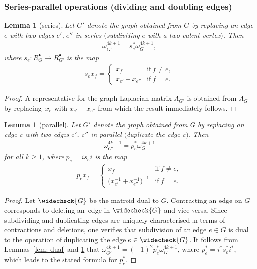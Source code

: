 \documentclass[pdftex]{sigma}%
\newtheorem{lem}[thm]{Lemma}
\numberwithin{equation}{section}
\newcommand{\0}{\color{blue}{\mathsf{0}}}
\begin{document}
 \subsubsection{Series-parallel operations (dividing and doubling edges)}

\begin{lem}[series] \label{lem: series}
 Let $G'$ denote the graph obtained from $G$ by replacing an edge $e$ with two edges $e'$, $e''$ in series $($subdividing $e$ with a two-valent vertex$)$. Then
\begin{gather*}
 \omega^{4k+1}_{G'} = s_{e}^* \omega^{4k+1}_{G},
 \end{gather*}
where $s_e\colon R^{\bullet}_G \rightarrow R^{\bullet}_{G'}$ is the map
\begin{gather} \label{sedef}
s_e x_f = \begin{cases}
x_f &\text{if} \ f \neq e,
\\
 x_{e'}+x_{e''}& \text{if} \ f =e.
 \end{cases}
\end{gather}
\end{lem}
\begin{proof}
A representative for the graph Laplacian matrix $\Lambda_{G'}$ is obtained from $\Lambda_G$ by repla\-cing~$x_e$ with $x_{e'}+ x_{e''}$ from which the result immediately follows.
\end{proof}

\begin{lem}[parallel] \label{lem: parallel}
 Let $G'$ denote the graph obtained from $G$ by replacing an edge $e$ with two edges $e'$, $e''$ in parallel $($duplicate the edge $e)$. Then
\begin{gather*}
 \omega^{4k+1}_{G'} = p_e^* \omega^{4k+1}_{G}
 \end{gather*}
for all $k\geq 1$,
where $p_e= i s_e i$ is the map
\begin{gather} \label{pedef}
p_e x_f = \begin{cases}
x_f &\text{if} \ f \neq e,
\\
\big(x^{-1}_{e'}+x^{-1}_{e''}\big)^{-1} &\text{if}\ f =e .
\end{cases}
\end{gather}
\end{lem}
\begin{proof}
Let $\widecheck{G}$ be the matroid dual to $G$. Contracting an edge on $G$ corresponds to deleting an~edge in $\widecheck{G}$ and vice versa.
 Since subdividing and duplicating edges are uniquely characterised in terms of contractions and deletions, one verifies that subdivision of an edge $e\in G$ is dual to the operation of duplicating the edge $e \in \widecheck{G}$. It follows from Lemmas~\ref{lem: dual} and \ref{lem: series} that $\omega^{4k+1}_{G'} = (-1)^2 p_e^* \omega^{4k+1}_{G} $, where $p_e^* =i^* s_e^* i^*$, which leads to the stated formula for $p_e^*$. \end{proof}
\end{document}
